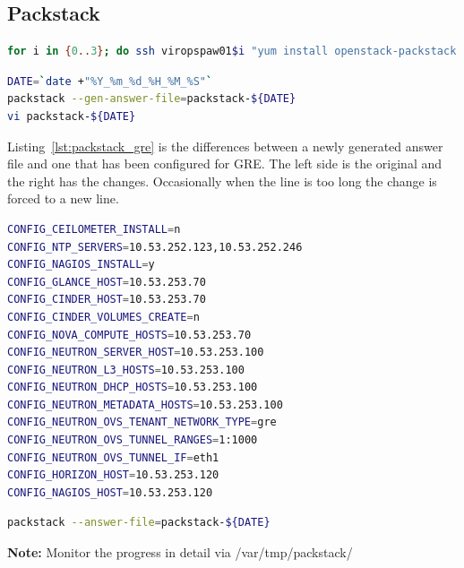 \documentclass[11pt,letterpaper,oneside]{book}
\begin{document}
\subsection{Packstack}
\begin{lstlisting}[caption={Packstack remote install after big hammer},language=bash]
for i in {0..3}; do ssh viropspaw01$i "yum install openstack-packstack -y"; done
\end{lstlisting}

\begin{lstlisting}[caption={Configure Packstack},language=bash]
DATE=`date +"%Y_%m_%d_%H_%M_%S"`
packstack --gen-answer-file=packstack-${DATE}
vi packstack-${DATE}

\end{lstlisting}

Listing~\ref{lst:packstack_gre} is the differences between a newly generated answer file and one that has been configured for GRE.  The left side is the original and the right has the changes.  Occasionally when the line is too long the change is forced to a new line.

\begin{lstlisting}[caption={Changes in Packstack answer file},label={lst:packstack_gre},language=bash,breakatwhitespace=true]
CONFIG_CEILOMETER_INSTALL=n
CONFIG_NTP_SERVERS=10.53.252.123,10.53.252.246
CONFIG_NAGIOS_INSTALL=y
CONFIG_GLANCE_HOST=10.53.253.70
CONFIG_CINDER_HOST=10.53.253.70
CONFIG_CINDER_VOLUMES_CREATE=n
CONFIG_NOVA_COMPUTE_HOSTS=10.53.253.70
CONFIG_NEUTRON_SERVER_HOST=10.53.253.100
CONFIG_NEUTRON_L3_HOSTS=10.53.253.100
CONFIG_NEUTRON_DHCP_HOSTS=10.53.253.100
CONFIG_NEUTRON_METADATA_HOSTS=10.53.253.100
CONFIG_NEUTRON_OVS_TENANT_NETWORK_TYPE=gre
CONFIG_NEUTRON_OVS_TUNNEL_RANGES=1:1000
CONFIG_NEUTRON_OVS_TUNNEL_IF=eth1
CONFIG_HORIZON_HOST=10.53.253.120
CONFIG_NAGIOS_HOST=10.53.253.120
\end{lstlisting}

\begin{lstlisting}[caption={Execute Packstack},language=bash]
packstack --answer-file=packstack-${DATE}
\end{lstlisting}
\textbf{Note:} Monitor the progress in detail via /var/tmp/packstack/
\end{document}

